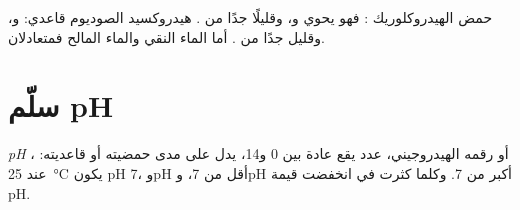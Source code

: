 \begin{example}\label{ex:g9:acids-bases-ph:three}
حمض الهيدروكلوريك : فهو يحوي  
و، وقليلًا جدًا من .  هيدروكسيد الصوديوم
قاعدي:  و، وقليل جدًا من . أما الماء
النقي والماء المالح فمتعادلان.
\end{example}

\section{سلّم pH}

\begin{definition}[pH]\label{def:g9:acids-bases-ph:ph}
\emph{pH} ، أو رقمه الهيدروجيني، عدد يقع عادة بين 0 و14،
يدل على مدى حمضيته أو قاعديته: عند \qty{25}{\celsius} يكون pH  7،
وpH  أقل من 7، وpH  أكبر من 7. وكلما كثرت
  في  انخفضت قيمة pH.
\end{definition}

